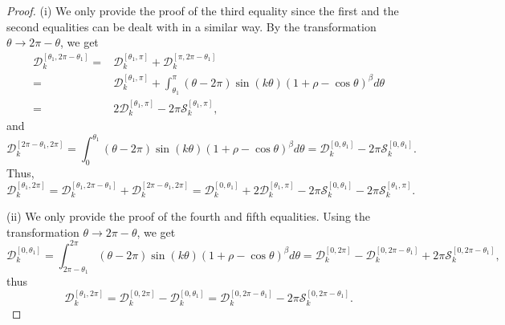 \documentclass[10pt,a4paper]{amsart}
\begin{document}
\begin{proof} (i)
We only provide the proof of the third equality since the first and the second equalities can be dealt with in a similar way. By the transformation $\theta \to 2\pi-\theta$, we get
\begin{equation*} \label{relaprooeq1}
\begin{split}
\mathcal{D}_{k}^{\left[\theta_{1},2\pi-\theta_1\right]}=&\mathcal{D}_{k}^{\left[\theta_{1},\pi\right]}+\mathcal{D}_{k}^{\left[\pi,2\pi-\theta_1\right]}\\
=&\mathcal{D}_{k}^{\left[\theta_{1},\pi\right]}+\int_{\theta_1}^{\pi}(\theta-2\pi)\sin(k\theta)\left(1+\rho-\cos\theta\right)^{\beta}d\theta\\
=&2\mathcal{D}_{k}^{\left[\theta_{1},\pi\right]}-2\pi\mathcal{S}_{k}^{\left[\theta_{1},\pi\right]},
\end{split}
\end{equation*}
and
\begin{equation*}
\mathcal{D}_{k}^{\left[2\pi-\theta_{1},2\pi\right]}=\int_0^{\theta_1}(\theta-2\pi)\sin(k\theta)\left(1+\rho-\cos\theta\right)^{\beta}d\theta=\mathcal{D}_{k}^{\left[0,\theta_{1}\right]}-2\pi\mathcal{S}_{k}^{\left[0,\theta_{1}\right]}.
\end{equation*}
Thus, $$\mathcal{D}_{k}^{\left[\theta_{1},2\pi\right]}=\mathcal{D}_{k}^{\left[\theta_{1},2\pi-\theta_1\right]}+\mathcal{D}_{k}^{\left[2\pi-\theta_{1},2\pi\right]}
=\mathcal{D}_{k}^{\left[0,\theta_{1}\right]}+2\mathcal{D}_{k}^{\left[\theta_{1},\pi\right]}-2\pi\mathcal{S}_{k}^{\left[0,\theta_{1}\right]}-2\pi\mathcal{S}_{k}^{\left[\theta_{1},\pi\right]}.$$



 (ii)
We only provide the proof of the   fourth and fifth  equalities. Using  the transformation $\theta \to 2\pi-\theta$, we get
\begin{equation*} \label{relaprooeq2}
\mathcal{D}_{k}^{\left[0,\theta_{1}\right]}=\int_{2\pi-\theta_1}^{2\pi}(\theta-2\pi)\sin(k\theta)\left(1+\rho-\cos\theta\right)^{\beta}d\theta=\mathcal{D}_{k}^{\left[0,2\pi\right]}-\mathcal{D}_{k}^{\left[0,2\pi-\theta_{1}\right]}+2\pi\mathcal{S}_{k}^{\left[0,2\pi-\theta_{1}\right]},
\end{equation*}
thus \begin{equation*}
\mathcal{D}_{k}^{\left[\theta_{1}, 2\pi\right]}=\mathcal{D}_{k}^{\left[0,2\pi\right]}-\mathcal{D}_{k}^{\left[0,\theta_{1}\right]}=\mathcal{D}_{k}^{\left[0,2\pi-\theta_{1}\right]}-2\pi\mathcal{S}_{k}^{\left[0,2\pi-\theta_{1}\right]}.
\end{equation*}


\end{proof}
\end{document}
